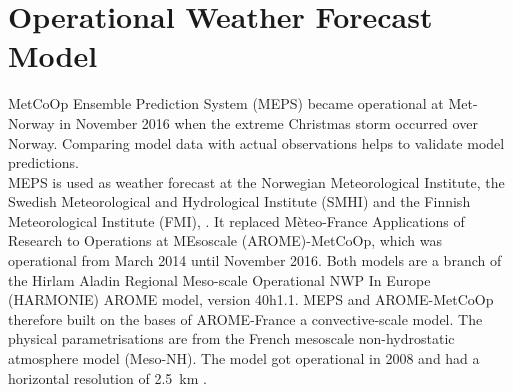 \section{Operational Weather Forecast Model}\label{sec:DIM:MEPS}
MetCoOp Ensemble Prediction System (MEPS) became operational at Met-Norway in November 2016 when the extreme Christmas storm occurred over Norway. Comparing model data with actual observations helps to validate %
model predictions. %
\\
MEPS is used as weather forecast at the Norwegian Meteorological Institute, the Swedish Meteorological and Hydrological Institute (SMHI) and the Finnish Meteorological Institute (FMI), \citep{muller_arome-metcoop:_2017, koltzow_metcoop_2017}.
It replaced Mèteo-France Applications of Research to Operations at MEsoscale (AROME)-MetCoOp, which was operational from March 2014 until November 2016. %
Both models are a branch of the Hirlam Aladin Regional Meso-scale Operational NWP In Europe (HARMONIE) AROME model, version 40h1.1. MEPS and AROME-MetCoOp therefore built on the bases of AROME-France a convective-scale model. The physical parametrisations are from the French mesoscale non-hydrostatic atmosphere model (Meso-NH). The model got operational in 2008 and had a horizontal resolution of \SI{2.5}{\km} \citep{seity_arome-france_2010}. 

